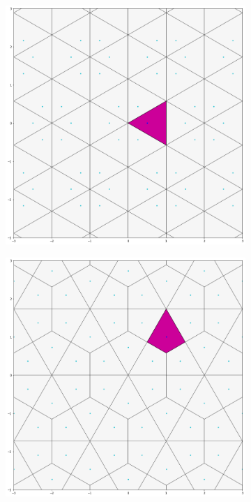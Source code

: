 \documentclass[12pt]{article}
\begin{document}
  \begin{figure}[H]
  \begin{subfigure}[b]{0.32\textwidth}
    \includegraphics[width=.9\textwidth]{dirihleov1.png}
    \label{fig:f1}
  \end{subfigure}
  \begin{subfigure}[b]{0.32\textwidth}
    \includegraphics[width=.9\textwidth]{dirihleov2.png}
    \label{fig:f2}

\end{subfigure}
\end{figure}
\end{document}
